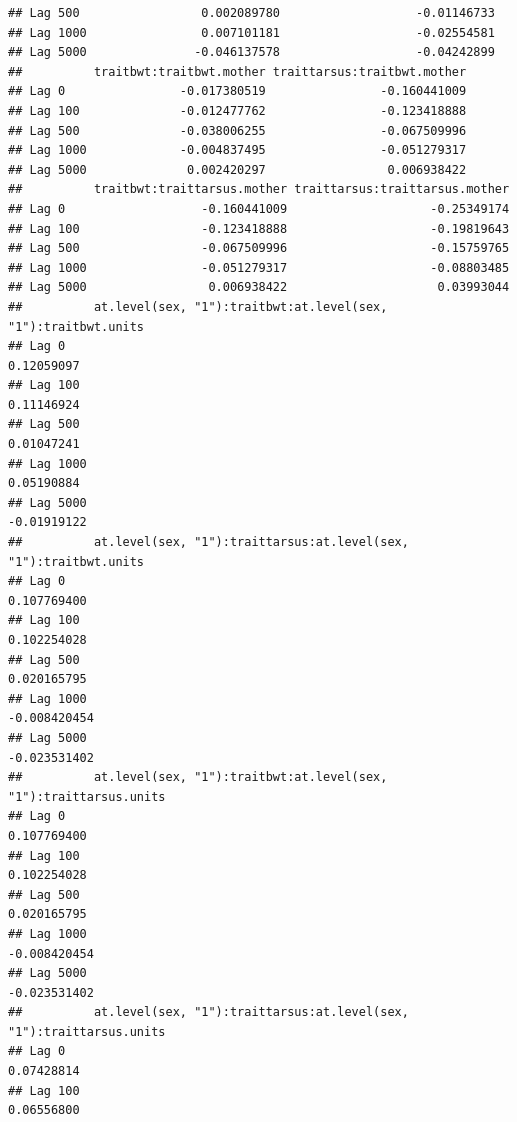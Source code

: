 \documentclass[
  12pt,
]{book}
\begin{document}
\begin{verbatim}
## Lag 500                 0.002089780                   -0.01146733
## Lag 1000                0.007101181                   -0.02554581
## Lag 5000               -0.046137578                   -0.04242899
##          traitbwt:traitbwt.mother traittarsus:traitbwt.mother
## Lag 0                -0.017380519                -0.160441009
## Lag 100              -0.012477762                -0.123418888
## Lag 500              -0.038006255                -0.067509996
## Lag 1000             -0.004837495                -0.051279317
## Lag 5000              0.002420297                 0.006938422
##          traitbwt:traittarsus.mother traittarsus:traittarsus.mother
## Lag 0                   -0.160441009                    -0.25349174
## Lag 100                 -0.123418888                    -0.19819643
## Lag 500                 -0.067509996                    -0.15759765
## Lag 1000                -0.051279317                    -0.08803485
## Lag 5000                 0.006938422                     0.03993044
##          at.level(sex, "1"):traitbwt:at.level(sex, "1"):traitbwt.units
## Lag 0                                                       0.12059097
## Lag 100                                                     0.11146924
## Lag 500                                                     0.01047241
## Lag 1000                                                    0.05190884
## Lag 5000                                                   -0.01919122
##          at.level(sex, "1"):traittarsus:at.level(sex, "1"):traitbwt.units
## Lag 0                                                         0.107769400
## Lag 100                                                       0.102254028
## Lag 500                                                       0.020165795
## Lag 1000                                                     -0.008420454
## Lag 5000                                                     -0.023531402
##          at.level(sex, "1"):traitbwt:at.level(sex, "1"):traittarsus.units
## Lag 0                                                         0.107769400
## Lag 100                                                       0.102254028
## Lag 500                                                       0.020165795
## Lag 1000                                                     -0.008420454
## Lag 5000                                                     -0.023531402
##          at.level(sex, "1"):traittarsus:at.level(sex, "1"):traittarsus.units
## Lag 0                                                             0.07428814
## Lag 100                                                           0.06556800

\end{verbatim}
\end{document}
